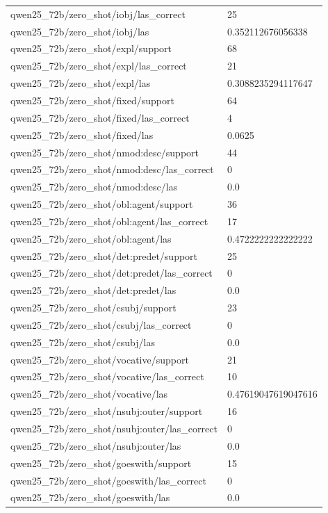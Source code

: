 \begin{tabular}{ll}
qwen25\_72b/zero\_shot/iobj/las\_correct & 25 \\
qwen25\_72b/zero\_shot/iobj/las & 0.352112676056338 \\
qwen25\_72b/zero\_shot/expl/support & 68 \\
qwen25\_72b/zero\_shot/expl/las\_correct & 21 \\
qwen25\_72b/zero\_shot/expl/las & 0.3088235294117647 \\
qwen25\_72b/zero\_shot/fixed/support & 64 \\
qwen25\_72b/zero\_shot/fixed/las\_correct & 4 \\
qwen25\_72b/zero\_shot/fixed/las & 0.0625 \\
qwen25\_72b/zero\_shot/nmod:desc/support & 44 \\
qwen25\_72b/zero\_shot/nmod:desc/las\_correct & 0 \\
qwen25\_72b/zero\_shot/nmod:desc/las & 0.0 \\
qwen25\_72b/zero\_shot/obl:agent/support & 36 \\
qwen25\_72b/zero\_shot/obl:agent/las\_correct & 17 \\
qwen25\_72b/zero\_shot/obl:agent/las & 0.4722222222222222 \\
qwen25\_72b/zero\_shot/det:predet/support & 25 \\
qwen25\_72b/zero\_shot/det:predet/las\_correct & 0 \\
qwen25\_72b/zero\_shot/det:predet/las & 0.0 \\
qwen25\_72b/zero\_shot/csubj/support & 23 \\
qwen25\_72b/zero\_shot/csubj/las\_correct & 0 \\
qwen25\_72b/zero\_shot/csubj/las & 0.0 \\
qwen25\_72b/zero\_shot/vocative/support & 21 \\
qwen25\_72b/zero\_shot/vocative/las\_correct & 10 \\
qwen25\_72b/zero\_shot/vocative/las & 0.47619047619047616 \\
qwen25\_72b/zero\_shot/nsubj:outer/support & 16 \\
qwen25\_72b/zero\_shot/nsubj:outer/las\_correct & 0 \\
qwen25\_72b/zero\_shot/nsubj:outer/las & 0.0 \\
qwen25\_72b/zero\_shot/goeswith/support & 15 \\
qwen25\_72b/zero\_shot/goeswith/las\_correct & 0 \\
qwen25\_72b/zero\_shot/goeswith/las & 0.0 \\

\end{tabular}
